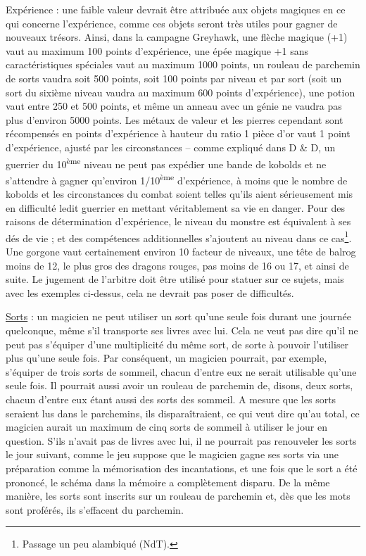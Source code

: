 Expérience : une faible valeur devrait être attribuée aux objets magiques en ce qui concerne l'expérience, comme ces objets seront très utiles pour gagner de nouveaux trésors. Ainsi, dans la campagne Greyhawk, une flèche magique (+1) vaut au maximum 100 points d'expérience, une épée magique +1 sans caractéristiques spéciales vaut au maximum 1000 points, un rouleau de parchemin de sorts vaudra soit 500 points, soit 100 points par niveau et par sort (soit un sort du sixième niveau vaudra au maximum 600 points d'expérience), une potion vaut entre 250 et 500 points, et même un anneau avec un génie ne vaudra pas plus d'environ 5000 points. Les métaux de valeur et les pierres cependant sont récompensés en points d'expérience à hauteur du ratio 1 pièce d'or vaut 1 point d'expérience, ajusté par les circonstances -- comme expliqué dans D \& D, un guerrier du 10\textsuperscript{ème} niveau ne peut pas expédier une bande de kobolds et ne s'attendre à gagner qu'environ 1/10\textsuperscript{ème} d'expérience, à moins que le nombre de kobolds et les circonstances du combat soient telles qu'ils aient sérieusement mis en difficulté ledit guerrier en mettant véritablement sa vie en danger. Pour des raisons de détermination d'expérience, le niveau du monstre est équivalent à ses dés de vie ; et des compétences additionnelles s'ajoutent au niveau dans ce cas\footnote{
    Passage un peu alambiqué (NdT).
}. Une gorgone vaut certainement environ 10 facteur de niveaux, une tête de balrog moins de 12, le plus gros des dragons rouges, pas moins de 16 ou 17, et ainsi de suite. Le jugement de l'arbitre doit être utilisé pour statuer sur ce sujets, mais avec les exemples ci-dessus, cela ne devrait pas poser de difficultés.

\medskip

\uline{Sorts} : un magicien ne peut utiliser un sort qu'une seule fois durant une journée quelconque, même s'il transporte ses livres avec lui. Cela ne veut pas dire qu'il ne peut pas s'équiper d'une multiplicité du même sort, de sorte à pouvoir l'utiliser plus qu'une seule fois. Par conséquent, un magicien pourrait, par exemple, s'équiper de trois sorts de sommeil, chacun d'entre eux ne serait utilisable qu'une seule fois. Il pourrait aussi avoir un rouleau de parchemin de, disons, deux sorts, chacun d'entre eux étant aussi des sorts des sommeil. A mesure que les sorts seraient lus dans le parchemins, ils disparaîtraient, ce qui veut dire qu'au total, ce magicien aurait un maximum de cinq sorts de sommeil à utiliser le jour en question. S'ils n'avait pas de livres avec lui, il ne pourrait pas renouveler les sorts le jour suivant, comme le jeu suppose que le magicien gagne ses sorts via une préparation comme la mémorisation des incantations, et une fois que le sort a été prononcé, le schéma dans la mémoire a complètement disparu. De la même manière, les sorts sont inscrits sur un rouleau de parchemin et, dès que les mots sont proférés, ils s'effacent du parchemin.

